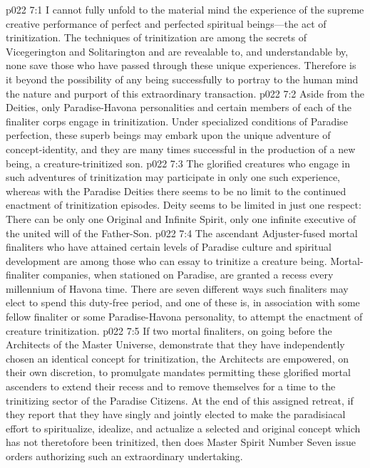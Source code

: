 \vs p022 7:1 I cannot fully unfold to the material mind the experience of the supreme creative performance of perfect and perfected spiritual beings---the act of trinitization. The techniques of trinitization are among the secrets of Vicegerington and Solitarington and are revealable to, and understandable by, none save those who have passed through these unique experiences. Therefore is it beyond the possibility of any being successfully to portray to the human mind the nature and purport of this extraordinary transaction.
\vs p022 7:2 Aside from the Deities, only Paradise\hyp{}Havona personalities and certain members of each of the finaliter corps engage in trinitization. Under specialized conditions of Paradise perfection, these superb beings may embark upon the unique adventure of concept\hyp{}identity, and they are many times successful in the production of a new being, a creature\hyp{}trinitized son.
\vs p022 7:3 The glorified creatures who engage in such adventures of trinitization may participate in only one such experience, whereas with the Paradise Deities there seems to be no limit to the continued enactment of trinitization episodes. Deity seems to be limited in just one respect: There can be only one Original and Infinite Spirit, only one infinite executive of the united will of the Father\hyp{}Son.
\vs p022 7:4 The ascendant Adjuster\hyp{}fused mortal finaliters who have attained certain levels of Paradise culture and spiritual development are among those who can essay to trinitize a creature being. Mortal\hyp{}finaliter companies, when stationed on Paradise, are granted a recess every millennium of Havona time. There are seven different ways such finaliters may elect to spend this duty\hyp{}free period, and one of these is, in association with some fellow finaliter or some Paradise\hyp{}Havona personality, to attempt the enactment of creature trinitization.
\vs p022 7:5 If two mortal finaliters, on going before the Architects of the Master Universe, demonstrate that they have independently chosen an identical concept for trinitization, the Architects are empowered, on their own discretion, to promulgate mandates permitting these glorified mortal ascenders to extend their recess and to remove themselves for a time to the trinitizing sector of the Paradise Citizens. At the end of this assigned retreat, if they report that they have singly and jointly elected to make the paradisiacal effort to spiritualize, idealize, and actualize a selected and original concept which has not theretofore been trinitized, then does Master Spirit Number Seven issue orders authorizing such an extraordinary undertaking.
